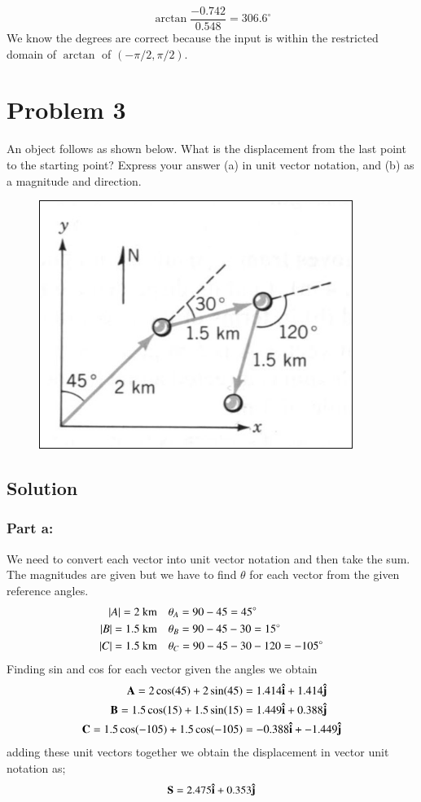 \documentclass{article}
\begin{document}
\[
	\arctan \frac{-0.742}{0.548} = 306.6^\circ
\]
We know the degrees are correct because the input is within the restricted domain of $\arctan$ of $(-\pi/ 2, \pi/2)$.

\section*{Problem 3}
An object follows as shown below. What is the displacement from the last point to the
starting point? Express your answer (a) in unit vector notation, and (b) as a magnitude and
direction.

\begin{figure}[ht]
    \centering
    \includegraphics[scale=0.5]{graph-2.png}
\end{figure}

\subsection*{Solution}
\subsubsection*{Part a:}
We need to convert each vector into unit vector notation and then take the sum. The magnitudes are given but we have to find $\theta$ for each vector from the given reference angles.
\begin{align*}
	\vb |A| = 2\ \text{km} &\quad \theta_A = 90 - 45 = 45^\circ \\
	\vb |B| = 1.5\ \text{km} &\quad \theta_B = 90 - 45 - 30 = 15^\circ \\
	\vb |C| = 1.5\ \text{km} &\quad \theta_C = 90 - 45 - 30 - 120 = -105^\circ \\
\end{align*}
Finding sin and cos for each vector given the angles we obtain
\begin{align*}
	\vb A = 2\cos (45) + 2\sin (45) &= 1.414 \vu i + 1.414 \vu j \\
	\vb B = 1.5\cos (15) + 1.5\sin (15) &= 1.449 \vu i + 0.388 \vu j \\
	\vb C = 1.5\cos (-105) + 1.5\cos (-105) &= -0.388 \vu i + -1.449 \vu j
\end{align*}
adding these unit vectors together we obtain the displacement in vector unit notation as;
\[
	\vb S = 2.475 \vu i + 0.353 \vu j
\]
\end{document}
